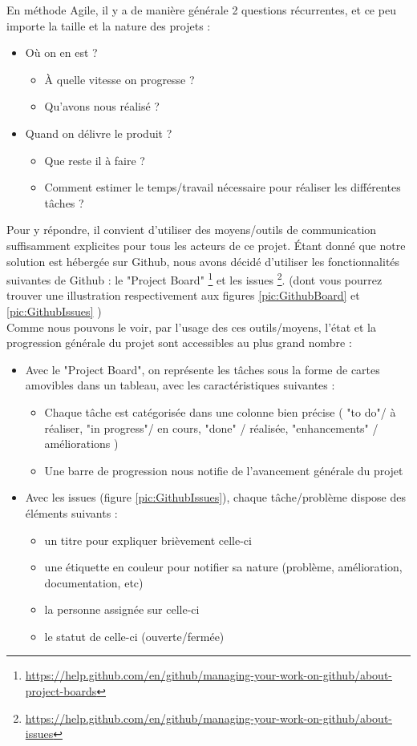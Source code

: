 En méthode Agile\cite{agileManifeste}, il y a de manière générale 2 questions récurrentes, et ce peu importe la taille et la nature des projets :
\begin{itemize}
    \item Où on en est ? 
    \begin{itemize}
        \item À quelle vitesse on progresse ?
        \item Qu'avons nous réalisé ?
    \end{itemize}
    \item Quand on délivre le produit ?
    \begin{itemize}
        \item Que reste il à faire ?
        \item Comment estimer le temps/travail nécessaire pour réaliser les différentes tâches ?
    \end{itemize}
\end{itemize}

Pour y répondre, il convient d'utiliser des moyens/outils de communication suffisamment explicites pour tous les acteurs de ce projet. Étant donné que notre solution est hébergée sur Github, nous avons décidé d'utiliser les fonctionnalités suivantes de Github : le "Project Board" \footnote{\url{https://help.github.com/en/github/managing-your-work-on-github/about-project-boards}} et les issues \footnote{\url{https://help.github.com/en/github/managing-your-work-on-github/about-issues}}. (dont vous pourrez trouver une illustration respectivement aux figures \ref{pic:GithubBoard} et \ref{pic:GithubIssues} )\\

Comme nous pouvons le voir, par l'usage des ces outils/moyens, l'état et la progression générale du projet sont accessibles au plus grand nombre : 
\begin{itemize}
    \item Avec le "Project Board", on représente les tâches sous la forme de cartes amovibles dans un tableau, avec les caractéristiques suivantes :
    \begin{itemize}
        \item Chaque tâche est catégorisée dans une colonne bien précise ( "to do"/ à réaliser, "in progress"/ en cours, "done" / réalisée, "enhancements" / améliorations  )
        \item Une barre de progression nous notifie de l'avancement générale du projet
    \end{itemize}
    \item Avec les issues (figure \ref{pic:GithubIssues}), chaque tâche/problème dispose des éléments suivants : 
    \begin{itemize}
        \item un titre pour expliquer brièvement celle-ci
        \item une étiquette en couleur pour notifier sa nature (problème, amélioration, documentation, etc)
        \item la personne assignée sur celle-ci
        \item le statut de celle-ci (ouverte/fermée)
    \end{itemize}
\end{itemize}


